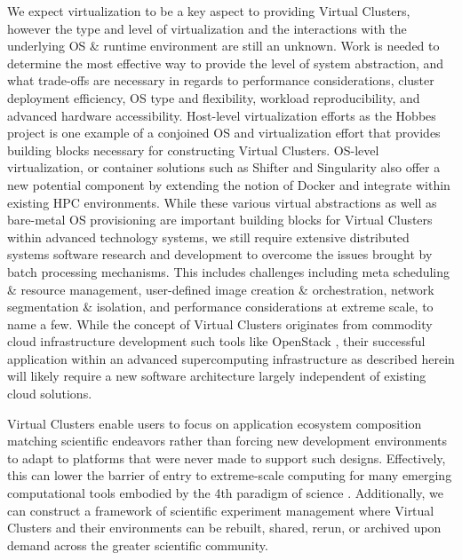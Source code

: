 We expect virtualization to be a key aspect to providing Virtual Clusters, however the type and level of virtualization and the interactions with the underlying OS \& runtime environment are still an unknown.  Work is needed to determine the most effective way to provide the level of system abstraction, and what trade-offs are necessary in regards to performance considerations, cluster deployment efficiency, OS type and flexibility, workload reproducibility, and advanced hardware accessibility.  Host-level virtualization efforts as the Hobbes project \cite{brightwell2013hobbes} is one example of a conjoined OS and virtualization effort that provides building blocks necessary for constructing Virtual Clusters.  OS-level virtualization, or container solutions such as Shifter \cite{jacobsen2015contain} and Singularity \cite{singularity} also offer a new potential component by extending the notion of Docker and integrate within existing HPC environments. While these various virtual abstractions as well as bare-metal OS provisioning \cite{baremetal} are important building blocks for Virtual Clusters within advanced technology systems, we still require extensive distributed systems software research and development to overcome the issues brought by batch processing mechanisms. This includes challenges including meta scheduling \& resource management, user-defined image creation \& orchestration, network segmentation \& isolation, and performance considerations at extreme scale, to name a few.  While the concept of Virtual Clusters originates from commodity cloud infrastructure development such tools like OpenStack \cite{openstackhpc, Younge2015hpvc}, their successful application within an advanced supercomputing infrastructure as described herein will likely require a new software architecture largely independent of existing cloud solutions.  



Virtual Clusters enable users to focus on application ecosystem composition matching scientific endeavors rather than forcing new development environments to adapt to platforms that were never made to support such designs.  Effectively, this can lower the barrier of entry to extreme-scale computing for many emerging computational tools embodied by the 4th paradigm of science \cite{hey2009fourth}. Additionally, we can construct a framework of scientific experiment management where Virtual Clusters and their environments can be rebuilt, shared, rerun, or archived upon demand across the greater scientific community.










